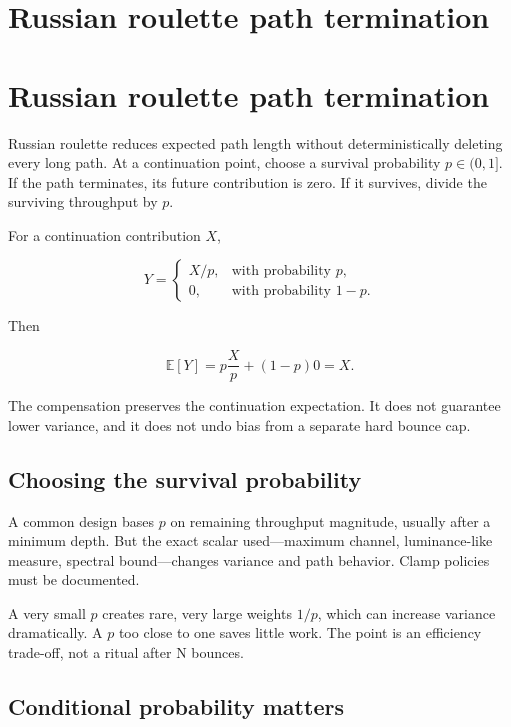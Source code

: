 \hypertarget{appendix-7277c62d4599}{}
\section*{Russian roulette path termination}
\section{Russian roulette path termination}\label{russian-roulette-path-termination}

Russian roulette reduces expected path length without deterministically deleting every long path. At a continuation point, choose a survival probability \(p\in(0,1]\). If the path terminates, its future contribution is zero. If it survives, divide the surviving throughput by \(p\).

For a continuation contribution \(X\),

\[
Y=
\begin{cases}
X/p,&\text{with probability }p,\\
0,&\text{with probability }1-p.
\end{cases}
\]

Then

\[
\mathbb E[Y]
=
p\frac{X}{p}+(1-p)0
=
X.
\]

The compensation preserves the continuation expectation. It does not guarantee lower variance, and it does not undo bias from a separate hard bounce cap.

\subsection{Choosing the survival probability}\label{choosing-the-survival-probability}

A common design bases \(p\) on remaining throughput magnitude, usually after a minimum depth. But the exact scalar used---maximum channel, luminance-like measure, spectral bound---changes variance and path behavior. Clamp policies must be documented.

A very small \(p\) creates rare, very large weights \(1/p\), which can increase variance dramatically. A \(p\) too close to one saves little work. The point is an efficiency trade-off, not a ritual after N bounces.

\subsection{Conditional probability matters}\label{conditional-probability-matters}

